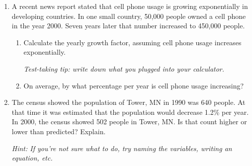 \documentclass[12pt]{article}
\begin{document}
\begin{enumerate}
\newpage

\item A recent news report stated that cell phone usage is growing exponentially in developing countries.  In one small country, 50,000 people owned a cell phone in the year 2000.  Seven years later that number increased to 450,000 people.  

\begin{enumerate}
\item Calculate the yearly growth factor, assuming cell phone usage increases exponentially.  

\emph{Test-taking tip:  write down what you plugged into your calculator.}
\vfill
\vfill
\item On average, by what percentage per year is cell phone usage increasing?
\vfill
\end{enumerate}

\hrulefill


\item The census showed the population of Tower, MN in 1990 was 640 people.  At that time it was estimated that the population would decrease 1.2\% per year.  In 2000, the census showed 502 people in Tower, MN.  Is that count higher or lower than predicted?  Explain.

\emph{Hint:  If you're not sure what to do, try naming the variables, writing an equation, etc.}
\vfill
\vfill
\vfill
\vfill





\end{enumerate}
\end{document}
